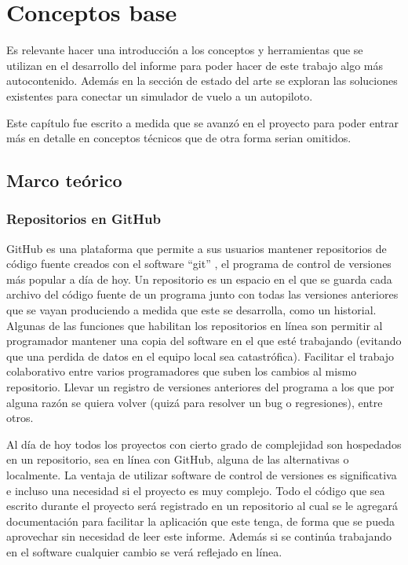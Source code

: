 \chapter{Conceptos base}

Es relevante hacer una introducción a los conceptos y herramientas que se utilizan en el desarrollo del informe para poder hacer de este trabajo algo más autocontenido. Además en la sección de estado del arte se exploran las soluciones existentes para conectar un simulador de vuelo a un autopiloto.

Este capítulo fue escrito a medida que se avanzó en el proyecto para poder entrar más en detalle en conceptos técnicos que de otra forma serian omitidos.

\section{Marco teórico}

\subsection{Repositorios en GitHub}

GitHub \cite{github} es una plataforma que permite a sus usuarios mantener repositorios de código fuente creados con el software ``git'' \cite{git}, el programa de control de versiones más popular a día de hoy. Un repositorio es un espacio en el que se guarda cada archivo del código fuente de un programa junto con todas las versiones anteriores que se vayan produciendo a medida que este se desarrolla, como un historial. Algunas de las funciones que habilitan los repositorios en línea son permitir al programador mantener una copia del software en el que esté trabajando (evitando que una perdida de datos en el equipo local sea catastrófica). Facilitar el trabajo colaborativo entre varios programadores que suben los cambios al mismo repositorio. Llevar un registro de versiones anteriores del programa a los que por alguna razón se quiera volver (quizá para resolver un bug o regresiones), entre otros.

Al día de hoy todos los proyectos con cierto grado de complejidad son hospedados en un repositorio, sea en línea con GitHub, alguna de las alternativas o localmente. La ventaja de utilizar software de control de versiones es significativa e incluso una necesidad si el proyecto es muy complejo. Todo el código que sea escrito durante el proyecto será registrado en un repositorio al cual se le agregará documentación para facilitar la aplicación que este tenga, de forma que se pueda aprovechar sin necesidad de leer este informe. Además si se continúa trabajando en el software cualquier cambio se verá reflejado en línea.

